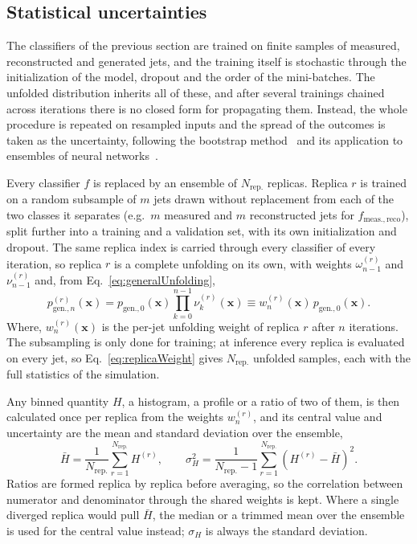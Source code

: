  \subsection{Statistical uncertainties}
 \label{sec:bootstrap}
 The classifiers of the previous section are trained on finite samples of measured, reconstructed and generated jets, and the training itself is stochastic through the initialization of the model, dropout and the order of the mini-batches. 
 The unfolded distribution inherits all of these, and after several trainings chained across iterations there is no closed form for propagating them. 
 Instead, the whole procedure is repeated on resampled inputs and the spread of the outcomes is taken as the uncertainty, following the bootstrap method~\cite{Efron:1979bootstrap} and its application to ensembles of neural networks~\cite{Lakshminarayanan:2016ensembles}. 
 
 Every classifier \(f\) is replaced by an ensemble of \(N_\mathrm{rep.}\) replicas. 
 Replica \(r\) is trained on a random subsample of \(m\) jets drawn without replacement from each of the two classes it separates (e.g.\ \(m\) measured and \(m\) reconstructed jets for \(f_\mathrm{meas., reco}\)), split further into a training and a validation set, with its own initialization and dropout. 
 The same replica index is carried through every classifier of every iteration, so replica \(r\) is a complete unfolding on its own, with weights \(\omega^{(r)}_{n-1}\) and \(\nu^{(r)}_{n-1}\) and, from Eq.~\ref{eq:generalUnfolding},
 \begin{equation}
 	\label{eq:replicaWeight}
 	p^{(r)}_{\mathrm{gen.}, n}(\mathbf{x}) = p_{\mathrm{gen.}, 0}(\mathbf{x})\prod_{k=0}^{n-1}\nu^{(r)}_k(\mathbf{x}) \equiv w^{(r)}_n(\mathbf{x})\,p_{\mathrm{gen.}, 0}(\mathbf{x}).
 \end{equation}
 Where, \(w^{(r)}_n(\mathbf{x})\) is the per-jet unfolding weight of replica \(r\) after \(n\) iterations. 
 The subsampling is only done for training; at inference every replica is evaluated on every jet, so Eq.~\ref{eq:replicaWeight} gives \(N_\mathrm{rep.}\) unfolded samples, each with the full statistics of the simulation. 
 
 Any binned quantity \(H\), a histogram, a profile or a ratio of two of them, is then calculated once per replica from the weights \(w^{(r)}_n\), and its central value and uncertainty are the mean and standard deviation over the ensemble,
 \begin{equation}
 	\label{eq:bootstrapUnc}
 	\bar{H} = \frac{1}{N_\mathrm{rep.}}\sum_{r=1}^{N_\mathrm{rep.}} H^{(r)} , \qquad
 	\sigma_H^2 = \frac{1}{N_\mathrm{rep.} - 1}\sum_{r=1}^{N_\mathrm{rep.}}\left(H^{(r)} - \bar{H}\right)^2 .
 \end{equation}
 Ratios are formed replica by replica before averaging, so the correlation between numerator and denominator through the shared weights is kept. 
 Where a single diverged replica would pull \(\bar{H}\), the median or a trimmed mean over the ensemble is used for the central value instead; \(\sigma_H\) is always the standard deviation. 
 
